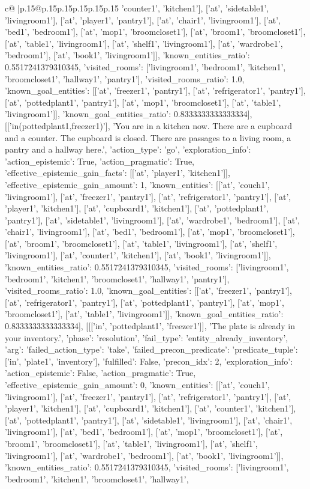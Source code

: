 \documentclass{article}
\begin{document}
{\begin{supertabular}{c@{$\;$}|p{.15\linewidth}@{}p{.15\linewidth}p{.15\linewidth}p{.15\linewidth}p{.15\linewidth}p{.15\linewidth}}
{{{'counter1', 'kitchen1'], ['at', 'sidetable1', 'livingroom1'], ['at', 'player1', 'pantry1'], ['at', 'chair1', 'livingroom1'], ['at', 'bed1', 'bedroom1'], ['at', 'mop1', 'broomcloset1'], ['at', 'broom1', 'broomcloset1'], ['at', 'table1', 'livingroom1'], ['at', 'shelf1', 'livingroom1'], ['at', 'wardrobe1', 'bedroom1'], ['at', 'book1', 'livingroom1']], 'known_entities_ratio': 0.5517241379310345, 'visited_rooms': ['livingroom1', 'bedroom1', 'kitchen1', 'broomcloset1', 'hallway1', 'pantry1'], 'visited_rooms_ratio': 1.0, 'known_goal_entities': [['at', 'freezer1', 'pantry1'], ['at', 'refrigerator1', 'pantry1'], ['at', 'pottedplant1', 'pantry1'], ['at', 'mop1', 'broomcloset1'], ['at', 'table1', 'livingroom1']], 'known_goal_entities_ratio': 0.8333333333333334}}], [['in(pottedplant1,freezer1)'], 'You are in a kitchen now. There are a cupboard and a counter. The cupboard is closed. There are passages to a living room, a pantry and a hallway here.', {'action_type': 'go', 'exploration_info': {'action_epistemic': True, 'action_pragmatic': True, 'effective_epistemic_gain_facts': [['at', 'player1', 'kitchen1']], 'effective_epistemic_gain_amount': 1, 'known_entities': [['at', 'couch1', 'livingroom1'], ['at', 'freezer1', 'pantry1'], ['at', 'refrigerator1', 'pantry1'], ['at', 'player1', 'kitchen1'], ['at', 'cupboard1', 'kitchen1'], ['at', 'pottedplant1', 'pantry1'], ['at', 'sidetable1', 'livingroom1'], ['at', 'wardrobe1', 'bedroom1'], ['at', 'chair1', 'livingroom1'], ['at', 'bed1', 'bedroom1'], ['at', 'mop1', 'broomcloset1'], ['at', 'broom1', 'broomcloset1'], ['at', 'table1', 'livingroom1'], ['at', 'shelf1', 'livingroom1'], ['at', 'counter1', 'kitchen1'], ['at', 'book1', 'livingroom1']], 'known_entities_ratio': 0.5517241379310345, 'visited_rooms': ['livingroom1', 'bedroom1', 'kitchen1', 'broomcloset1', 'hallway1', 'pantry1'], 'visited_rooms_ratio': 1.0, 'known_goal_entities': [['at', 'freezer1', 'pantry1'], ['at', 'refrigerator1', 'pantry1'], ['at', 'pottedplant1', 'pantry1'], ['at', 'mop1', 'broomcloset1'], ['at', 'table1', 'livingroom1']], 'known_goal_entities_ratio': 0.8333333333333334}}], [[['in', 'pottedplant1', 'freezer1']], 'The plate is already in your inventory.', {'phase': 'resolution', 'fail_type': 'entity_already_inventory', 'arg': {'failed_action_type': 'take', 'failed_precon_predicate': {'predicate_tuple': ['in', 'plate1', 'inventory'], 'fulfilled': False, 'precon_idx': 2}}, 'exploration_info': {'action_epistemic': False, 'action_pragmatic': True, 'effective_epistemic_gain_amount': 0, 'known_entities': [['at', 'couch1', 'livingroom1'], ['at', 'freezer1', 'pantry1'], ['at', 'refrigerator1', 'pantry1'], ['at', 'player1', 'kitchen1'], ['at', 'cupboard1', 'kitchen1'], ['at', 'counter1', 'kitchen1'], ['at', 'pottedplant1', 'pantry1'], ['at', 'sidetable1', 'livingroom1'], ['at', 'chair1', 'livingroom1'], ['at', 'bed1', 'bedroom1'], ['at', 'mop1', 'broomcloset1'], ['at', 'broom1', 'broomcloset1'], ['at', 'table1', 'livingroom1'], ['at', 'shelf1', 'livingroom1'], ['at', 'wardrobe1', 'bedroom1'], ['at', 'book1', 'livingroom1']], 'known_entities_ratio': 0.5517241379310345, 'visited_rooms': ['livingroom1', 'bedroom1', 'kitchen1', 'broomcloset1', 'hallway1', }}}
\end{supertabular}}
\end{document}
